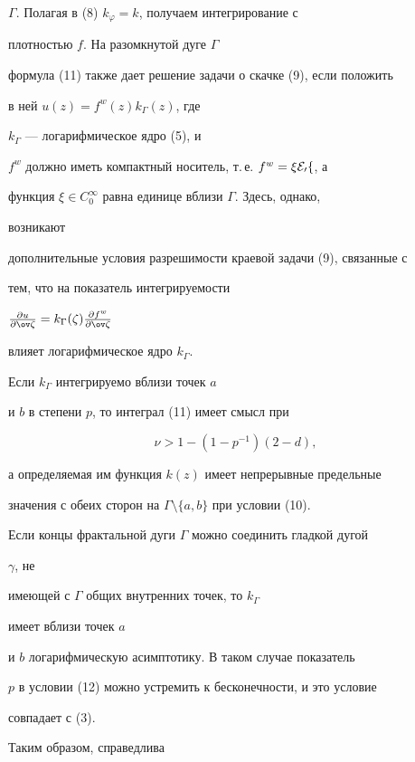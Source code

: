 $\Gamma$. Полагая в (8) $k_\varphi=k$, получаем интегрирование с 


плотностью $f$. На разомкнутой дуге $\Gamma$


формула (11) также дает решение задачи о скачке (9), если положить 


в ней $u(z)=f^w(z)k_\Gamma(z)$, где 


$k_\Gamma$ --- логарифмическое ядро (5), и


$f^w$ должно иметь компактный носитель, т.\,е. $f^w=\xi\cal E_0f$, а 


функция $\xi\in C^\infty_0$ равна единице вблизи $\Gamma$. Здесь, однако, 


возникают 


дополнительные условия разрешимости краевой задачи (9), связанные с 


тем, что на показатель интегрируемости 


$\myfrac{u}{\ov\zeta}=k_\Gamma(\zeta)\myfrac{f^w}{\ov\zeta}$ 


влияет логарифмическое ядро $k_\Gamma$. 


Если $k_\Gamma$ интегрируемо вблизи точек $a$ 


и $b$ в степени $p$, то интеграл (11) имеет смысл при 


\begin{equation} 


\nu>1-(1-p^{-1})(2-d),


\end{equation} 


а определяемая им функция $k(z)$ имеет непрерывные предельные 


значения с обеих сторон на $\Gamma\setminus\{a,b\}$ при условии (10). 


Если концы фрактальной дуги $\Gamma$ можно соединить гладкой дугой 


$\gamma$, не 


имеющей с $\Gamma$ общих внутренних точек, то $k_\Gamma$ 


имеет вблизи точек $a$ 


и $b$ логарифмическую асимптотику. В таком случае показатель 


$p$ в условии (12) можно устремить к бесконечности, и это условие 


совпадает с (3). 


 


Таким образом, справедлива 


 


